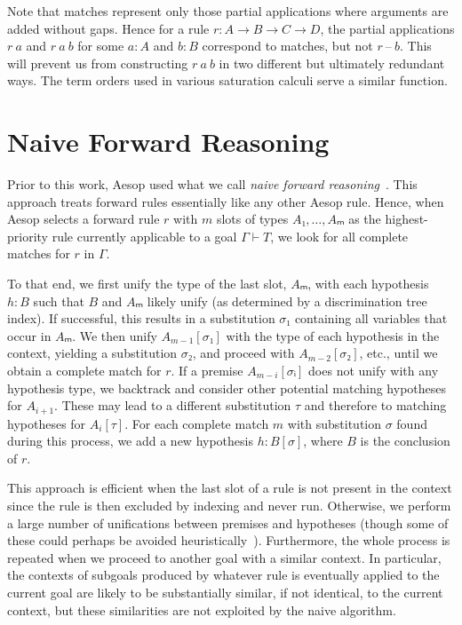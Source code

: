 \documentclass[runningheads,leqno]{llncs}
\begin{document}
Note that matches represent only those partial applications where arguments are added without gaps.
Hence for a rule $r : A → B → C → D$, the partial applications $r~a$ and $r~a~b$ for some $a : A$ and $b : B$ correspond to matches, but not $r~\text{--}~b$.
This will prevent us from constructing $r~a~b$ in two different but ultimately redundant ways.
The term orders used in various saturation calculi serve a similar function.

\section{Naive Forward Reasoning}%
\label{sec:naive}

Prior to this work, Aesop used what we call \emph{naive forward reasoning}~\cite{Aesop}.
This approach treats forward rules essentially like any other Aesop rule.
Hence, when Aesop selects a forward rule $r$ with $m$ slots of types $A₁, \dots, Aₘ$ as the highest-priority rule currently applicable to a goal $Γ ⊢ T$, we look for all complete matches for $r$ in $Γ$.

To that end, we first unify the type of the last slot, $Aₘ$, with each hypothesis $h : B$ such that $B$ and $Aₘ$ likely unify (as determined by a discrimination tree index).
If successful, this results in a substitution $σ₁$ containing all variables that occur in $Aₘ$.
We then unify $A_{m-1}[σ₁]$ with the type of each hypothesis in the context, yielding a substitution $σ₂$, and proceed with $A_{m-2}[σ₂]$, etc., until we obtain a complete match for $r$.
If a premise $A_{m-i}[σᵢ]$ does not unify with any hypothesis type, we backtrack and consider other potential matching hypotheses for $A_{i+1}$.
These may lead to a different substitution $τ$ and therefore to matching hypotheses for $A_{i}[τ]$.
For each complete match $m$ with substitution $σ$ found during this process, we add a new hypothesis $h : B[σ]$, where $B$ is the conclusion of $r$.

This approach is efficient when the last slot of a rule is not present in the context since the rule is then excluded by indexing and never run.
Otherwise, we perform a large number of unifications between premises and hypotheses (though some of these could perhaps be avoided heuristically~\cite{TammetSubsumption}).
Furthermore, the whole process is repeated when we proceed to another goal with a similar context.
In particular, the contexts of subgoals produced by whatever rule is eventually applied to the current goal are likely to be substantially similar, if not identical, to the current context, but these similarities are not exploited by the naive algorithm.
\end{document}
